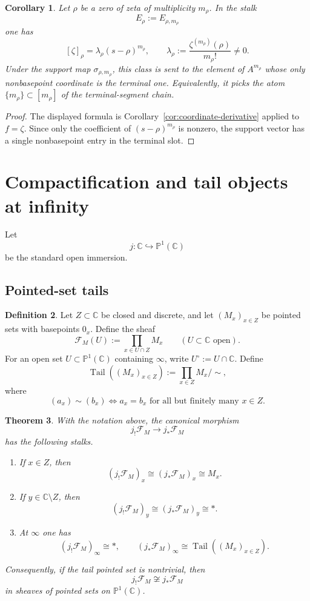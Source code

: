 \documentclass[11pt,a4paper]{article}
\numberwithin{equation}{section}
\newtheorem{theorem}{Theorem}[section]
\newtheorem{corollary}[theorem]{Corollary}
\theoremstyle{definition}
\newtheorem{definition}[theorem]{Definition}
\theoremstyle{remark}
\DeclareMathOperator{\Tail}{Tail}
\newcommand{\CC}{\mathbb C}
\newcommand{\PP}{\mathbb P}
\newcommand{\into}{\hookrightarrow}
\begin{document}
\begin{corollary}\label{cor:zeta-support-slot}
Let $\rho$ be a zero of zeta of multiplicity $m_\rho$.  In the stalk
\[
E_\rho:=E_{\rho,m_\rho}
\]
one has
\[
[\zeta]_\rho=\lambda_\rho (s-\rho)^{m_\rho},
\qquad
\lambda_\rho:=\frac{\zeta^{(m_\rho)}(\rho)}{m_\rho!}\neq0.
\]
Under the support map $\sigma_{\rho,m_\rho}$, this class is sent to the element of $A^{m_\rho}$ whose only nonbasepoint coordinate is the terminal one.  Equivalently, it picks the atom $\{m_\rho\}\subset [m_\rho]$ of the terminal-segment chain.
\end{corollary}

\begin{proof}
The displayed formula is Corollary~\ref{cor:coordinate-derivative} applied to $f=\zeta$.  Since only the coefficient of $(s-\rho)^{m_\rho}$ is nonzero, the support vector has a single nonbasepoint entry in the terminal slot.
\end{proof}

\section{Compactification and tail objects at infinity}

Let
\[
j:\CC\into\PP^1(\CC)
\]
be the standard open immersion.

\subsection{Pointed-set tails}

\begin{definition}
Let $Z\subset\CC$ be closed and discrete, and let $(M_x)_{x\in Z}$ be pointed sets with basepoints $0_x$.  Define the sheaf
\[
\mathcal F_M(U):=\prod_{x\in U\cap Z}M_x
\qquad (U\subset\CC\text{ open}).
\]
For an open set $U\subset\PP^1(\CC)$ containing $\infty$, write $U^\circ:=U\cap\CC$.  Define
\[
\Tail((M_x)_{x\in Z}):=\prod_{x\in Z}M_x\Big/\sim,
\]
where
\[
(a_x)\sim(b_x)\iff a_x=b_x\text{ for all but finitely many }x\in Z.
\]
\end{definition}

\begin{theorem}\label{thm:stalks-at-infty}
With the notation above, the canonical morphism
\[
j_!\mathcal F_M\longrightarrow j_*\mathcal F_M
\]
has the following stalks.
\begin{enumerate}[label=(\roman*)]
\item If $x\in Z$, then
\[
(j_!\mathcal F_M)_x\cong (j_*\mathcal F_M)_x\cong M_x.
\]
\item If $y\in\CC\setminus Z$, then
\[
(j_!\mathcal F_M)_y\cong (j_*\mathcal F_M)_y\cong *.
\]
\item At $\infty$ one has
\[
(j_!\mathcal F_M)_\infty\cong *,
\qquad
(j_*\mathcal F_M)_\infty\cong \Tail((M_x)_{x\in Z}).
\]
\end{enumerate}
Consequently, if the tail pointed set is nontrivial, then
\[
j_!\mathcal F_M\not\cong j_*\mathcal F_M
\]
in sheaves of pointed sets on $\PP^1(\CC)$.
\end{theorem}
\end{document}
